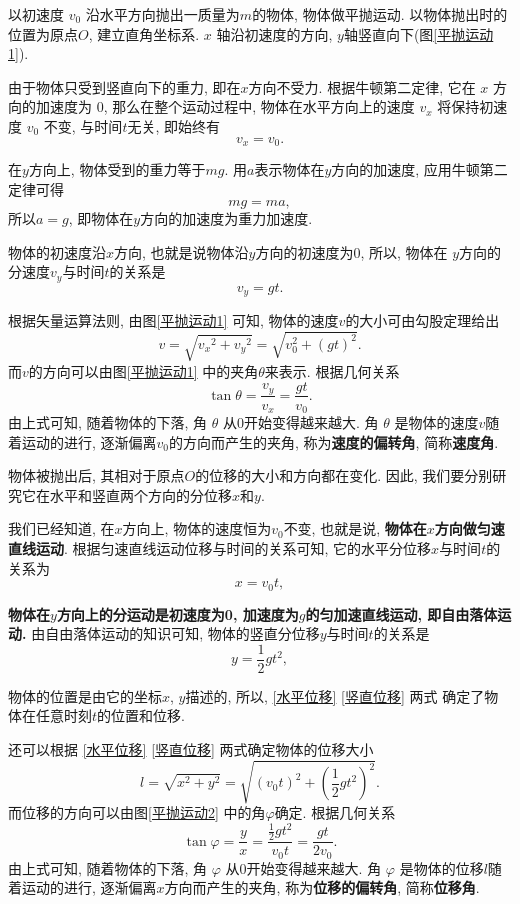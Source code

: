 \documentclass[11pt,a4paper]{ctexbook}
\begin{document}
以初速度 $v_0$ 沿水平方向抛出一质量为$m$的物体, 物体做平抛运动. 以物体抛出时的位置为原点$O$,
建立直角坐标系. $x$ 轴沿初速度的方向, $y$轴竖直向下(图\ref{平抛运动1}).

由于物体只受到竖直向下的重力, 即在$x$方向不受力. 根据牛顿第二定律,
它在 $x$ 方向的加速度为 0, 那么在整个运动过程中,
物体在水平方向上的速度 $ v_{x}$ 将保持初速度 $v_0$ 不变, 与时间$t$无关, 即始终有
$$v_x=v_0.$$

在$y$方向上, 物体受到的重力等于$mg$. 用$a$表示物体在$y$方向的加速度,
应用牛顿第二定律可得$$mg = ma, $$所以$a = g$, 即物体在$y$方向的加速度为重力加速度.

物体的初速度沿$x$方向, 也就是说物体沿$y$方向的初速度为0, 所以, 物体在
$y$方向的分速度$v_y$与时间$t$的关系是$$v_y = gt.$$

根据矢量运算法则, 由图\ref{平抛运动1} 可知, 物体的速度$v$的大小可由勾股定理给出
\begin{equation}
	v=\sqrt{{v_x}^2+{v_y}^2}=\sqrt{v_0^2+\left(gt\right)^2}.
	\label{合速度}
\end{equation}
而$v$的方向可以由图\ref{平抛运动1} 中的夹角$\theta$来表示. 根据几何关系
\begin{equation}
	\tan\theta = \frac{v_y}{v_x} = \frac{gt}{v_0}.
	\label{速度偏转角}
\end{equation}
由上式可知, 随着物体的下落, 角 $\theta$ 从0开始变得越来越大.
角 $\theta$ 是物体的速度$v$随着运动的进行, 逐渐偏离$v_0$的方向而产生的夹角, 称为\textbf{速度的偏转角}, 简称\textbf{速度角}.

物体被抛出后, 其相对于原点$O$的位移的大小和方向都在变化.
因此, 我们要分别研究它在水平和竖直两个方向的分位移$x$和$y$.

我们已经知道, 在$x$方向上, 物体的速度恒为$v_0$不变, 也就是说,
\textbf{物体在$x$方向做匀速直线运动}. 根据匀速直线运动位移与时间的关系可知,
它的水平分位移$x$与时间$t$的关系为
\begin{equation}
	\label{水平位移}
	x=v_0t,
\end{equation}

\textbf{物体在$y$方向上的分运动是初速度为0, 加速度为$g$的匀加速直线运动, 即自由落体运动.}
由自由落体运动的知识可知, 物体的竖直分位移$y$与时间$t$的关系是
\begin{equation}
	\label{竖直位移}
	y=\frac12gt^2,
\end{equation}

物体的位置是由它的坐标$x$, $y$描述的, 所以, \eqref{水平位移} \eqref{竖直位移} 两式
确定了物体在任意时刻$t$的位置和位移.

还可以根据 \eqref{水平位移} \eqref{竖直位移} 两式确定物体的位移大小
$$l=\sqrt{x^2+y^2}=\sqrt{\left(v_0t\right)^2+\left(\frac{1}{2}gt^2\right)^2}.$$
而位移的方向可以由图\ref{平抛运动2} 中的角$\varphi$确定. 根据几何关系
\begin{equation}
	\tan\varphi = \frac{y}{x} = \frac{\displaystyle\frac12gt^2}{v_0t} = \frac{gt}{2v_0}.
	\label{位移偏转角}
\end{equation}
由上式可知, 随着物体的下落, 角 $\varphi$ 从0开始变得越来越大.
角 $\varphi$ 是物体的位移$l$随着运动的进行, 逐渐偏离$x$方向而产生的夹角, 称为\textbf{位移的偏转角}, 简称\textbf{位移角}.
\end{document}
